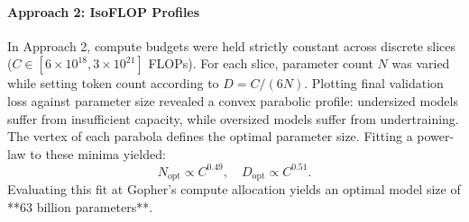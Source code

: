 \documentclass[../../../main.tex]{subfiles}
\begin{document}
\paragraph{Approach 2: IsoFLOP Profiles}
In Approach 2, compute budgets were held strictly constant across discrete slices ($C \in [6 \times 10^{18}, 3 \times 10^{21}]$ FLOPs). For each slice, parameter count $N$ was varied while setting token count according to $D = C / (6N)$. Plotting final validation loss against parameter size revealed a convex parabolic profile: undersized models suffer from insufficient capacity, while oversized models suffer from undertraining. The vertex of each parabola defines the optimal parameter size. Fitting a power-law to these minima yielded:
\begin{equation}
N_{\text{opt}} \propto C^{0.49}, \quad D_{\text{opt}} \propto C^{0.51}.
\label{eq:chinchilla_approach2_exponents}
\end{equation}
Evaluating this fit at Gopher's compute allocation yields an optimal model size of **63 billion parameters**.
\end{document}
